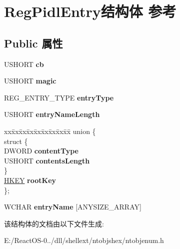 \hypertarget{struct_reg_pidl_entry}{}\section{Reg\+Pidl\+Entry结构体 参考}
\label{struct_reg_pidl_entry}
\subsection*{Public 属性}
\begin{DoxyCompactItemize}
\item 
\mbox{\label{struct_reg_pidl_entry_a2c177d6a7916b16c5dcccb705901fbb5}} 
U\+S\+H\+O\+RT {\bfseries cb}
\item 
\mbox{\label{struct_reg_pidl_entry_a8d0b31f1dc53249090c1f87b3f9fd145}} 
U\+S\+H\+O\+RT {\bfseries magic}
\item 
\mbox{\label{struct_reg_pidl_entry_ae9e88df16ac7cf3fa6d4c87611000474}} 
R\+E\+G\+\_\+\+E\+N\+T\+R\+Y\+\_\+\+T\+Y\+PE {\bfseries entry\+Type}
\item 
\mbox{\label{struct_reg_pidl_entry_a2ff7c1a667cb32f269dc640e7743a9e6}} 
U\+S\+H\+O\+RT {\bfseries entry\+Name\+Length}
\item 
\mbox{\label{struct_reg_pidl_entry_a210d8a0dbca6db52f7c5e0435ef56b48}} 
\begin{tabbing}
xx\=xx\=xx\=xx\=xx\=xx\=xx\=xx\=xx\=\kill
union \{\\
\mbox{\label{union_reg_pidl_entry_1_1_0D285_a89b1debb3b3498e111e6b53701e79330}} 
\>struct \{\\
\>\>DWORD {\bfseries contentType}\\
\>\>USHORT {\bfseries contentsLength}\\
\>\} \\
\>\hyperlink{interfacevoid}{HKEY} {\bfseries rootKey}\\
\}; \\

\end{tabbing}\item 
\mbox{\label{struct_reg_pidl_entry_a796f84b92f4061d789a874fee53f8a70}} 
W\+C\+H\+AR {\bfseries entry\+Name} \mbox{[}A\+N\+Y\+S\+I\+Z\+E\+\_\+\+A\+R\+R\+AY\mbox{]}
\end{DoxyCompactItemize}


该结构体的文档由以下文件生成\+:\begin{DoxyCompactItemize}
\item 
E\+:/\+React\+O\+S-\/0../dll/shellext/ntobjshex/ntobjenum.\+h\end{DoxyCompactItemize}
